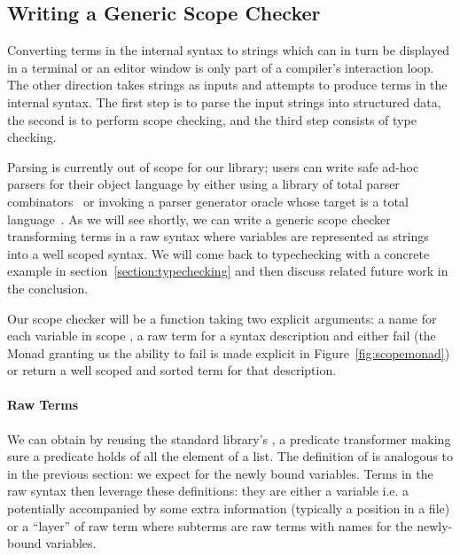 \subsection{Writing a Generic Scope Checker}\label{section:genericscoping}

Converting terms in the internal syntax to strings which can in turn be
displayed in a terminal or an editor window is only part of a compiler's
interaction loop. The other direction takes strings as inputs and attempts to
produce terms in the internal syntax. The first step is to parse the input
strings into structured data, the second is to perform scope checking,
and the third step consists of type checking.

Parsing is currently out of scope for our library; users can write safe
ad-hoc parsers for their object language by either using a library of total
parser combinators~\cite{DBLP:conf/icfp/Danielsson10,allais2018agdarsec}
or invoking a parser generator oracle whose target is a total
language~\cite{Stump:2016:VFP:2841316}. As we will see shortly, we can
write a generic scope checker transforming terms in a raw syntax where
variables are represented as strings into a well scoped syntax. We will
come back to typechecking with a concrete example in section~\ref{section:typechecking}
and then discuss related future work in the conclusion.

Our scope checker will be a function taking two explicit arguments: a name for
each variable in scope , a raw term for a syntax description  and
either fail (the Monad  granting us the ability to fail is made explicit
in Figure~\ref{fig:scopemonad}) or return a well scoped and sorted term for
that description.


\paragraph{Raw Terms} We can obtain  by reusing the standard library's
, a predicate transformer making sure a predicate holds of all the element
of a list. The definition of  is analogous to  in the
previous section: we expect  for the newly bound variables.
Terms in the raw syntax then leverage these definitions: they are either a variable
i.e. a  potentially accompanied by some extra information  (typically
a position in a file) or a ``layer'' of raw term where subterms are raw terms with
names for the newly-bound variables.

